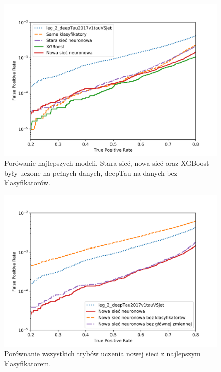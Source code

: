 \documentclass{pracalicmgr}
\begin{document}
	\begin{figure}
	\centering
	\includegraphics[width=1.\textwidth]{best_models.png}
	\caption{Porówanie najlepszych modeli. Stara sieć, nowa sieć oraz XGBoost były uczone na pełnych danych, deepTau na danych bez klasyfikatorów.}
	\label{fig:res_best}
	\end{figure}  
	
	\begin{figure}
	\centering
	\includegraphics[width=1.\textwidth]{new_network.png}
	\caption{Porównanie wszystkich trybów uczenia nowej sieci z najlepszym klasyfikatorem.}
	\label{fig:res_new}
	\end{figure} 	
	
\end{document}
